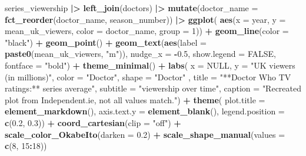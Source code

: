 \documentclass[
]{article}
\newenvironment{Shaded}{\begin{snugshade}}{\end{snugshade}}
\newcommand{\AttributeTok}[1]{\textcolor[rgb]{0.13,0.29,0.53}{#1}}
\newcommand{\ConstantTok}[1]{\textcolor[rgb]{0.56,0.35,0.01}{#1}}
\newcommand{\DecValTok}[1]{\textcolor[rgb]{0.00,0.00,0.81}{#1}}
\newcommand{\FloatTok}[1]{\textcolor[rgb]{0.00,0.00,0.81}{#1}}
\newcommand{\FunctionTok}[1]{\textcolor[rgb]{0.13,0.29,0.53}{\textbf{#1}}}
\newcommand{\NormalTok}[1]{#1}
\newcommand{\SpecialCharTok}[1]{\textcolor[rgb]{0.81,0.36,0.00}{\textbf{#1}}}
\newcommand{\StringTok}[1]{\textcolor[rgb]{0.31,0.60,0.02}{#1}}
\begin{document}
\begin{Shaded}
\begin{Highlighting}[]
\NormalTok{series\_viewership }\SpecialCharTok{|\textgreater{}}
  \FunctionTok{left\_join}\NormalTok{(doctors) }\SpecialCharTok{|\textgreater{}}
  \FunctionTok{mutate}\NormalTok{(}\AttributeTok{doctor\_name =} \FunctionTok{fct\_reorder}\NormalTok{(doctor\_name, season\_number)) }\SpecialCharTok{|\textgreater{}}
  \FunctionTok{ggplot}\NormalTok{(}
    \FunctionTok{aes}\NormalTok{(}\AttributeTok{x =}\NormalTok{ year, }\AttributeTok{y =}\NormalTok{ mean\_uk\_viewers, }\AttributeTok{color =}\NormalTok{ doctor\_name, }\AttributeTok{group =} \DecValTok{1}\NormalTok{)) }\SpecialCharTok{+} 
  \FunctionTok{geom\_line}\NormalTok{(}\AttributeTok{color =} \StringTok{"black"}\NormalTok{) }\SpecialCharTok{+} 
  \FunctionTok{geom\_point}\NormalTok{() }\SpecialCharTok{+} 
  \FunctionTok{geom\_text}\NormalTok{(}\FunctionTok{aes}\NormalTok{(}\AttributeTok{label =} \FunctionTok{paste0}\NormalTok{(mean\_uk\_viewers, }\StringTok{"m"}\NormalTok{)), }\AttributeTok{nudge\_x =} \SpecialCharTok{{-}}\FloatTok{0.5}\NormalTok{, }\AttributeTok{show.legend =} \ConstantTok{FALSE}\NormalTok{,  }\AttributeTok{fontface =} \StringTok{"bold"}\NormalTok{) }\SpecialCharTok{+}
  \FunctionTok{theme\_minimal}\NormalTok{() }\SpecialCharTok{+} 
   \FunctionTok{labs}\NormalTok{(}
     \AttributeTok{x =} \ConstantTok{NULL}\NormalTok{, }
     \AttributeTok{y =} \StringTok{"UK viewers (in millions)"}\NormalTok{,}
     \AttributeTok{color =} \StringTok{"Doctor"}\NormalTok{, }\AttributeTok{shape =} \StringTok{"Doctor"}\NormalTok{ , }
    \AttributeTok{title =} \StringTok{"**Doctor Who TV ratings:** series average"}\NormalTok{, }
    \AttributeTok{subtitle =} \StringTok{"viewership over time"}\NormalTok{, }
    \AttributeTok{caption =} \StringTok{"Recreated plot from Independent.ie, not all values match."}\NormalTok{) }\SpecialCharTok{+} 
    \FunctionTok{theme}\NormalTok{( }\AttributeTok{plot.title =} \FunctionTok{element\_markdown}\NormalTok{(), }
           \AttributeTok{axis.text.y =} \FunctionTok{element\_blank}\NormalTok{(), }
           \AttributeTok{legend.position =} \FunctionTok{c}\NormalTok{(}\FloatTok{0.2}\NormalTok{, }\FloatTok{0.3}\NormalTok{)) }\SpecialCharTok{+} 
   \FunctionTok{coord\_cartesian}\NormalTok{(}\AttributeTok{clip =} \StringTok{"off"}\NormalTok{) }\SpecialCharTok{+} 
  \FunctionTok{scale\_color\_OkabeIto}\NormalTok{(}\AttributeTok{darken =} \FloatTok{0.2}\NormalTok{) }\SpecialCharTok{+} 
  \FunctionTok{scale\_shape\_manual}\NormalTok{(}\AttributeTok{values =} \FunctionTok{c}\NormalTok{(}\DecValTok{8}\NormalTok{, }\DecValTok{15}\SpecialCharTok{:}\DecValTok{18}\NormalTok{))}
\end{Highlighting}
\end{Shaded}
\end{document}
